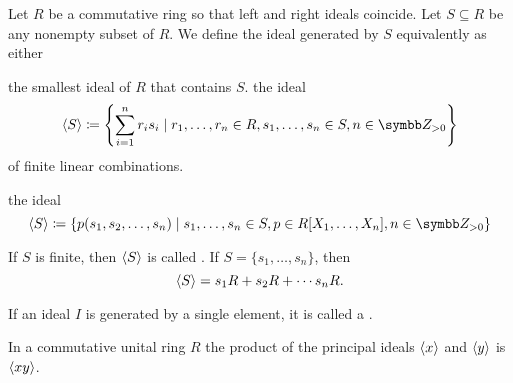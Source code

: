 \begin{definition}\label{def:generated_ring_ideal}
  Let \( R \) be a commutative ring so that left and right ideals coincide. Let \( S \subseteq R \) be any nonempty subset of \( R \). We define the ideal generated by \( S \) equivalently as either
  \begin{defenum}
     the smallest ideal of \( R \) that contains \( S \).
     the ideal
    \begin{equation*}
      \Gen S \coloneqq \left\{ \sum_{i=1}^n r_i s_i \mid r_1, \ldots, r_n \in R, s_1, \ldots, s_n \in S, n \in \Z_{>0} \right\}
    \end{equation*}
    of finite linear combinations.

     the ideal
    \begin{equation*}
      \Gen S \coloneqq \left\{ p(s_1, s_2, \ldots, s_n) \mid s_1, \ldots, s_n \in S, p \in R[X_1, \ldots, X_n], n \in \Z_{>0} \right\}
    \end{equation*}
  \end{defenum}

  If \( S \) is finite, then \( \left\langle S \right\rangle \) is called . If \( S = \{ s_1, \ldots, s_n \} \), then
  \begin{equation*}
    \left\langle S \right\rangle = s_1 R + s_2 R + \cdots s_n R.
  \end{equation*}
\end{definition}

\begin{definition}\label{def:principal_ideal}
  If an ideal \( I \) is generated by a single element, it is called a .
\end{definition}

\begin{proposition}\label{thm:product_of_principal_ideals}
  In a commutative unital ring \( R \) the product of the principal ideals \( \left\langle x \right\rangle \) and \( \left\langle y \right\rangle \) is \( \left\langle xy \right\rangle \).
\end{proposition}
